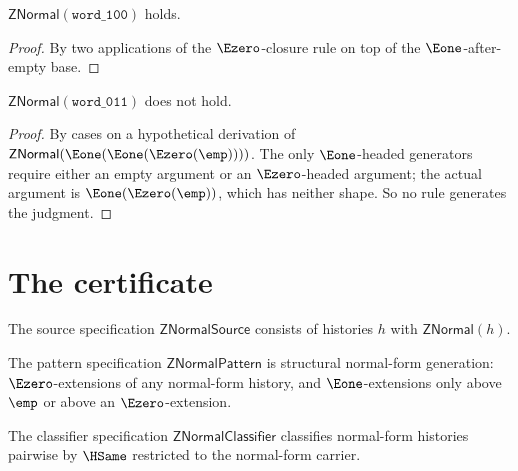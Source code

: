 \begin{theorem}
\label{thm:znormal-word-100}
\(\mathsf{ZNormal}(\mathtt{word\_100})\) holds.
\end{theorem}
\begin{proof}
By two applications of the \(\Ezero\)-closure rule on top of the \(\Eone\)-after-empty base.
\end{proof}

\begin{theorem}
\label{thm:znormal-word-011-absurd}
\(\mathsf{ZNormal}(\mathtt{word\_011})\) does not hold.
\end{theorem}
\begin{proof}
By cases on a hypothetical derivation of \(\mathsf{ZNormal}(\Eone(\Eone(\Ezero(\emp))))\). The only \(\Eone\)-headed generators require either an empty argument or an \(\Ezero\)-headed argument; the actual argument is \(\Eone(\Ezero(\emp))\), which has neither shape. So no rule generates the judgment.
\end{proof}

\section{The certificate}

\begin{definition}
\label{def:znormal-source-specification}
The source specification \(\mathsf{ZNormalSource}\) consists of histories \(h\) with \(\mathsf{ZNormal}(h)\).
\end{definition}

\begin{definition}
\label{def:znormal-pattern-specification}
The pattern specification \(\mathsf{ZNormalPattern}\) is structural normal-form generation: \(\Ezero\)-extensions of any normal-form history, and \(\Eone\)-extensions only above \(\emp\) or above an \(\Ezero\)-extension.
\end{definition}

\begin{definition}
\label{def:znormal-classifier-specification}
The classifier specification \(\mathsf{ZNormalClassifier}\) classifies normal-form histories pairwise by \(\HSame\) restricted to the normal-form carrier.
\end{definition}


